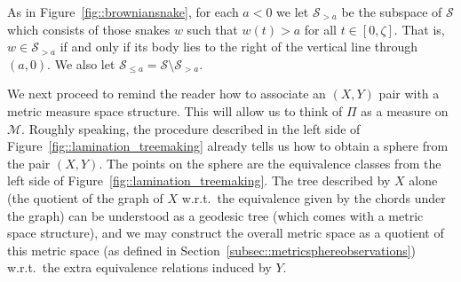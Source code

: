 \documentclass[10pt]{amsart}
\let\mathcal\mathscr
\theoremstyle{plain}
\numberwithin{theorem}{section}
\theoremstyle{definition}
\newcommand{\snake}{{\mathcal S}}
\newcommand\mmspace{{\mathcal M}}
\let\snakeexcursionmeasure \Pi
\begin{document}
As in Figure~\ref{fig::browniansnake}, for each $a < 0$ we let $\snake_{>a}$ be the subspace of $\snake$ which consists of those snakes $w$ such that $w(t) > a$ for all $t \in [0,\zeta]$. That is, $w \in \snake_{>a}$ if and only if its body lies to the right of the vertical line through $(a,0)$. We also let $\snake_{\leq a} = \snake \setminus \snake_{>a}$.

We next proceed to remind the reader how to associate an $(X,Y)$ pair with a metric measure space structure. This will allow us to think of $\snakeexcursionmeasure$ as a measure on $\mmspace$. Roughly speaking, the procedure described in the left side of Figure~\ref{fig::lamination_treemaking} already tells us how to obtain a sphere from the pair $(X,Y)$. The points on the sphere are the equivalence classes from the left side of Figure~\ref{fig::lamination_treemaking}. The tree described by $X$ alone (the quotient of the graph of $X$ w.r.t.\ the equivalence given by the chords under the graph) can be understood as a geodesic tree (which comes with a metric space structure), and we may construct the overall metric space as a quotient of this metric space (as defined in Section~\ref{subsec::metricsphereobservations}) w.r.t.\ the extra equivalence relations induced by $Y$.
\end{document}
